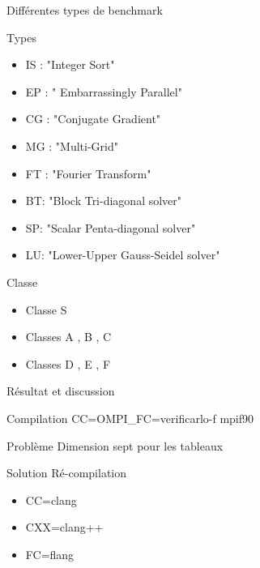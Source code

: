 \documentclass{beamer}
\begin{document}
\begin{frame}{ Différentes types de benchmark}
    \begin{block}{Types}
      \begin{itemize}
        \item IS : "Integer Sort"
        \item EP : " Embarrassingly Parallel"
        \item CG : "Conjugate Gradient" 
        \item MG : "Multi-Grid"
        \item FT : "Fourier Transform"
        \item BT: "Block Tri-diagonal solver"
        \item SP: "Scalar Penta-diagonal solver"
        \item LU: "Lower-Upper Gauss-Seidel solver"
    \end{itemize}
    \end{block}
        
    \begin{block}{Classe}
      \begin{itemize}
        \item Classe S 
        \item  Classes A , B , C 
        \item Classes D , E , F
      \end{itemize}
    \end{block}
    
\end{frame}

\begin{frame}{ Résultat et discussion}
    \begin{block}{Compilation}
      CC=OMPI\_FC=verificarlo-f  mpif90
    \end{block}
    
    \begin{block}{Problème}
      Dimension sept pour les tableaux
    \end{block}
    
    \begin{block}{Solution}
      Ré-compilation
      \begin{itemize}
          \item CC=clang
          \item CXX=clang++
          \item FC=flang
      \end{itemize}
    \end{block}
\end{frame}
\end{document}

